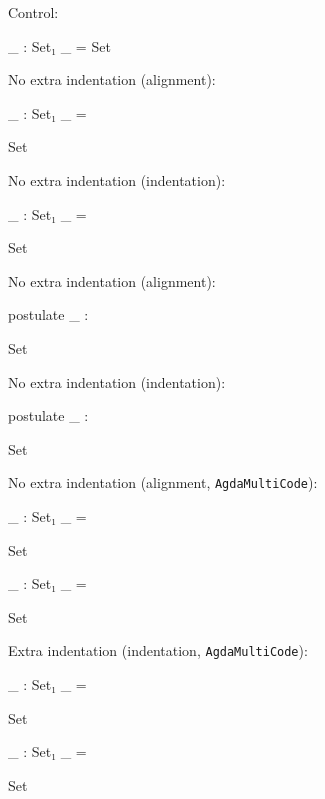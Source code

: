 \documentclass{article}
\begin{document}
\noindent Control:
\begin{code}
  _ : Set₁
  _ = Set
\end{code}

\noindent No extra indentation (alignment):
\begin{code}[hide]
  _ : Set₁
  _ =
\end{code}
\begin{code}
    Set
\end{code}

\noindent No extra indentation (indentation):
\begin{code}[hide]
  _ : Set₁
  _ =
\end{code}
\begin{code}
     Set
\end{code}

\noindent No extra indentation (alignment):
\begin{code}[hide]
  postulate
    _ :
\end{code}
\begin{code}
      Set
\end{code}

\noindent No extra indentation (indentation):
\begin{code}[hide]
  postulate
    _ :
\end{code}
\begin{code}
       Set
\end{code}

\noindent No extra indentation (alignment, \texttt{AgdaMultiCode}):
\begin{AgdaMultiCode}
\begin{code}[hide]
  _ : Set₁
  _ =
\end{code}
\begin{code}
    Set
\end{code}
\begin{code}[hide]
  _ : Set₁
  _ =
\end{code}
\begin{code}
    Set
\end{code}
\end{AgdaMultiCode}

\noindent Extra indentation (indentation, \texttt{AgdaMultiCode}):
\begin{AgdaMultiCode}
\begin{code}[hide]
  _ : Set₁
  _ =
\end{code}
\begin{code}
     Set
\end{code}
\begin{code}[hide]
  _ : Set₁
  _ =
\end{code}
\begin{code}
     Set
\end{code}
\end{AgdaMultiCode}
\end{document}

